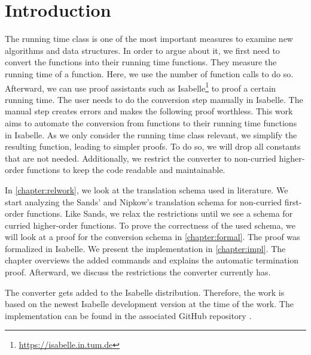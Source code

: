 \chapter{Introduction}\label{chapter:introduction}

The running time class is one of the most important measures to examine new algorithms and data structures.
In order to argue about it, we first need to convert the functions into their running time functions.
They measure the running time of a function.
Here, we use the number of function calls to do so.
Afterward, we can use proof assistants such as Isabelle\footnote{\url{https://isabelle.in.tum.de}} to proof a certain running time.
The user needs to do the conversion step manually in Isabelle.
The manual step creates errors and makes the following proof worthless.
This work aims to automate the conversion from functions to their running time functions in Isabelle.
As we only consider the running time class relevant, we simplify the resulting function, leading to simpler proofs.
To do so, we will drop all constants that are not needed.
Additionally, we restrict the converter to non-curried higher-order functions to keep the code readable and maintainable.

In \autoref{chapter:relwork}, we look at the translation schema used in literature.
We start analyzing the Sands' \parencite{sands} and Nipkow's \parencite{fds} translation schema for non-curried first-order functions.
Like Sands, we relax the restrictions until we see a schema for curried higher-order functions.
To prove the correctness of the used schema, we will look at a proof for the conversion schema in \autoref{chapter:formal}.
The proof was formalized in Isabelle.
We present the implementation in \autoref{chapter:impl}.
The chapter overviews the added commands and explains the automatic termination proof.
Afterward, we discuss the restrictions the converter currently has.

The converter gets added to the Isabelle distribution.
Therefore, the work is based on the newest Isabelle development version at the time of the work.
The implementation can be found in the associated GitHub repository \cite{repo}.
